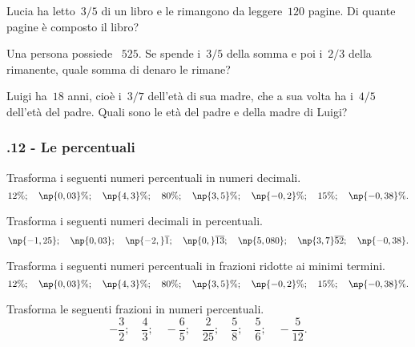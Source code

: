 \begin{esercizio}[\Ast]
 \label{ese:3.79}
Lucia ha letto~$3/5$ di un libro e le rimangono da leggere~$120$ pagine. Di quante pagine è composto il libro?
\end{esercizio}

\begin{esercizio}
 \label{ese:3.80}
Una persona possiede \officialeuro~$525$. Se spende i~$3/5$ della somma e poi i~$2/3$ della rimanente,
quale somma di denaro le rimane?
\end{esercizio}

\begin{esercizio}
 \label{ese:3.81}
Luigi ha~$18$ anni, cioè i~$3/7$ dell'età di sua madre, che a sua volta ha i~$4/5$ dell'età
del padre. Quali sono le età del padre e della madre di Luigi?
\end{esercizio}

\subsubsection*{\thechapter.12 - Le percentuali}

\begin{esercizio}
 \label{ese:3.82}
Trasforma i seguenti numeri percentuali in numeri decimali.
\[12\%;\quad \np{0,03}\%;\quad \np{4,3}\%;\quad 80\%;\quad \np{3,5}\%;\quad\np{-0,2}\%;\quad 15\%;\quad\np{-0,38}\%.\]
\end{esercizio}

\begin{esercizio}
 \label{ese:3.83}
Trasforma i seguenti numeri decimali in percentuali.
\[\np{-1,25};\quad \np{0,03};\quad \np{-2,}\overline{1};\quad \np{0,}\overline{13};\quad \np{5,080};\quad \np{3,7}\overline{52};\quad \np{-0,38}.\]
\end{esercizio}

\begin{esercizio}
 \label{ese:3.84}
Trasforma i seguenti numeri percentuali in frazioni ridotte ai minimi termini.
\[12\%;\quad \np{0,03}\%;\quad \np{4,3}\%;\quad 80\%;\quad \np{3,5}\%;\quad \np{-0,2}\%;\quad 15\%;\quad\np{-0,38}\%.\]
\end{esercizio}

\begin{esercizio}
\label{ese:3.85}
Trasforma le seguenti frazioni in numeri percentuali.
\[-\frac{3}{2};\quad\frac{4}{3};\quad-\frac{6}{5};\quad\frac{2}{25};\quad\frac{5}{8};
\quad\frac{5}{6};\quad-\frac{5}{12}.\]
\end{esercizio}

